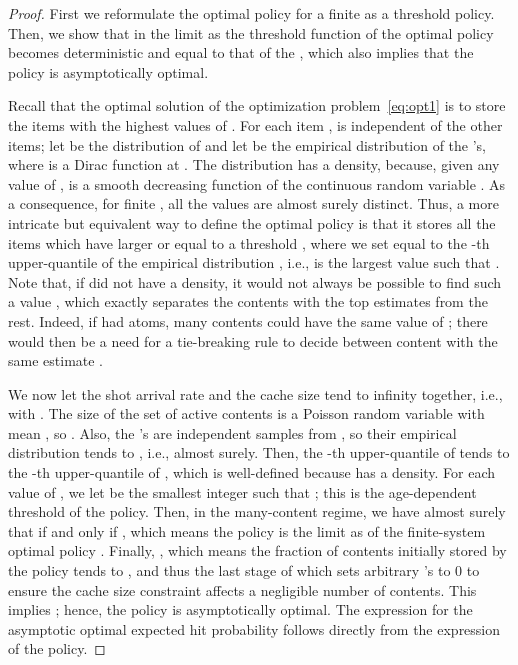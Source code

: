 \documentclass[10pt, conference, letterpaper]{IEEEtran}
\begin{document}
\begin{proof}First we reformulate the  optimal policy for a finite  as a threshold policy. Then, we show that in the limit as  the threshold function of the optimal policy becomes deterministic and equal to that of the , which also implies that the  policy is asymptotically optimal.

Recall that the optimal solution of the optimization problem~\eqref{eq:opt1} is to store the  items with the highest values of . For each item ,  is independent of the other items; let  be the distribution of  and let  be the empirical distribution of the 's, where  is a Dirac function at . The distribution  has a density, because, given any value of ,  is a smooth decreasing function of the continuous random variable . As a consequence, for finite , all the values  are almost surely distinct. Thus, a more intricate but equivalent way to define the optimal policy is that it stores all the items  which have  larger or equal to a threshold , where we set  equal to the -th upper-quantile of the empirical distribution , i.e.,  is the largest value such that . Note that, if  did not have a density, it would not always be possible to find such a value , which exactly separates the contents with the top  estimates  from the rest. Indeed, if  had atoms, many contents could have the same value of ; there would then be a need for a tie-breaking rule to decide between content with the same estimate .

We now let the shot arrival rate and the cache size tend to infinity together, i.e.,  with . The size  of the set of active contents is a Poisson random variable with mean , so . Also, the 's are independent samples from , so their empirical distribution tends to , i.e.,  almost surely. Then, the -th upper-quantile  of  tends to the -th upper-quantile  of , which is well-defined because  has a density. For each value of , we let  be the smallest integer  such that ; this is the age-dependent threshold of the  policy.
Then, in the many-content regime, we have almost surely that  if and only if , which means the  policy is the limit as  of the finite-system optimal policy . Finally, , which means the fraction of contents initially stored by the  policy tends to , and thus the last stage of  which sets arbitrary 's to 0 to ensure the cache size constraint affects a negligible number of contents. This implies ; hence, the  policy is asymptotically optimal. The expression for the asymptotic optimal expected hit probability  follows directly from the expression of the  policy.
\end{proof}
\end{document}
